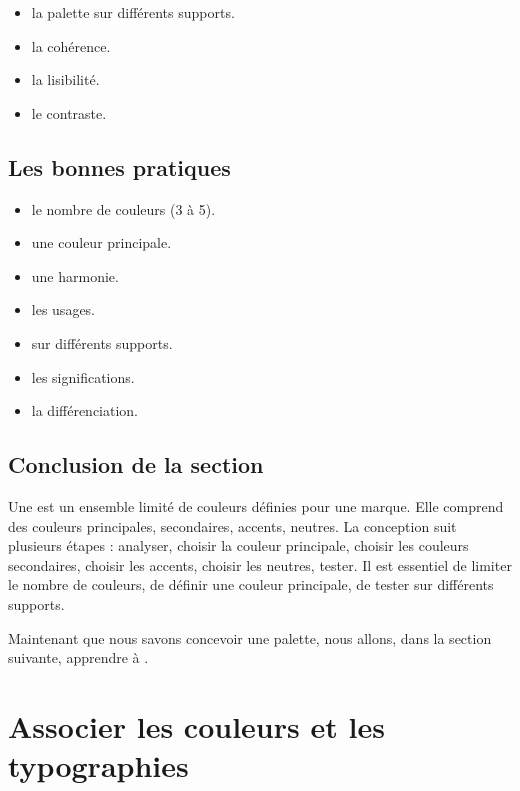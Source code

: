 \begin{itemize}
    \item {} la palette sur différents supports.
    \item {} la cohérence.
    \item {} la lisibilité.
    \item {} le contraste.
\end{itemize}

\subsection{Les bonnes pratiques}

\begin{itemize}
    \item {} le nombre de couleurs (3 à 5).
    \item {} une couleur principale.
    \item {} une harmonie.
    \item {} les usages.
    \item {} sur différents supports.
    \item {} les significations.
    \item {} la différenciation.
\end{itemize}

\subsection*{Conclusion de la section}

Une  est un ensemble limité de couleurs définies pour une marque. Elle comprend des couleurs principales, secondaires, accents, neutres. La conception suit plusieurs étapes : analyser, choisir la couleur principale, choisir les couleurs secondaires, choisir les accents, choisir les neutres, tester. Il est essentiel de limiter le nombre de couleurs, de définir une couleur principale, de tester sur différents supports.

Maintenant que nous savons concevoir une palette, nous allons, dans la section suivante, apprendre à .

\section{Associer les couleurs et les typographies}

